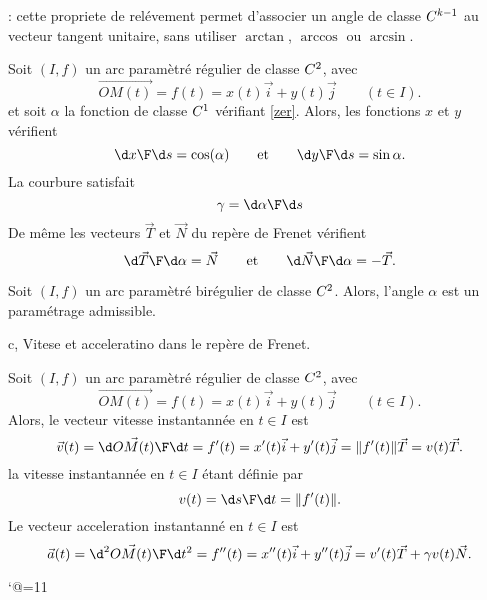 \Remarque : cette propriete de rel\'evement permet d'associer un angle de classe $\sc C^{k-1}$ au vecteur tangent unitaire, 
sans utiliser $\arctan$, $\arccos$ ou $\arcsin$. 
\bigskip


\Propriete []  Soit $(I,f)$ un arc param\`etr\'e r\'egulier de classe $\sc C^2$, avec 
$$
\vec{OM(t)}=f(t)=x(t)\vec i+y(t)\vec j\qquad (t\in I). 
$$
et soit $\alpha$ la fonction de classe $\sc C^1$ v\'erifiant \eqref{zer}. 
Alors, les fonctions $x$ et $y$ v\'erifient 
$$
{\d x\F\d s}=\cos(\alpha)\qquad \mbox{et}\qquad {\d y\F\d s}=\sin\alpha.
$$ 
La courbure satisfait
$$
\gamma={\d\alpha\F\d s}
$$
De m\^eme les vecteurs $\vec T$ et $\vec N$ du rep\`ere de Frenet v\'erifient
$$
{\d\vec T\F\d\alpha}=\vec N\qquad\mbox{et}\qquad{\d\vec N\F\d\alpha}=-\vec T.
$$

\Propriete []  Soit $(I,f)$ un arc param\`etr\'e bir\'egulier de classe $\sc C^2$. Alors, 
l'angle $\alpha$ est un param\'etrage admissible. 



\Section c, Vitese et acceleratino dans le rep\`ere de Frenet. 

\Propriete []  Soit $(I,f)$ un arc param\`etr\'e r\'egulier de classe $\sc C^2$, avec 
$$
\vec{OM(t)}=f(t)=x(t)\vec i+y(t)\vec j\qquad (t\in I). 
$$
Alors, le vecteur vitesse instantann\'ee en $t\in I$ est 
$$
\vec v(t)={\d\vec{OM(t)}\F \d t}=f'(t)=x'(t)\vec i+y'(t)\vec j=\|f'(t)\|\vec T=v(t)\vec T.
$$
la vitesse instantann\'ee en $t\in I$ \'etant d\'efinie par 
$$
v(t)={\d s\F\d t}=\|f'(t)\|.
$$
Le vecteur acceleration instantann\'e en $t\in I$ est 
$$
\vec a(t)={\d^2\vec{OM(t)}\F \d t^2}=f''(t)=x''(t)\vec i+y''(t)\vec j=v'(t)\vec T+\gamma v(t)\vec N.
$$








\catcode`@=11\relax

\def\LD@Font@Inferno{}


